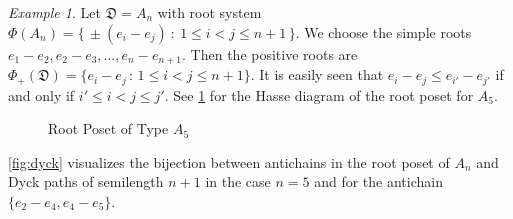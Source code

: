 \documentclass[11pt]{amsart}
\def\fD{\mathfrak{D}}
\theoremstyle{plain}
\numberwithin{lemma}{\DefaultNumberTheoremWithin}
\numberwithin{theorem}{\DefaultNumberTheoremWithin}
\numberwithin{corollary}{\DefaultNumberTheoremWithin}
\numberwithin{proposition}{\DefaultNumberTheoremWithin}
\numberwithin{conjecture}{\DefaultNumberTheoremWithin}
\theoremstyle{definition}
\numberwithin{definition}{\DefaultNumberTheoremWithin}
\numberwithin{question}{\DefaultNumberTheoremWithin}
\numberwithin{problem}{\DefaultNumberTheoremWithin}
\theoremstyle{remark}
\numberwithin{remark}{\DefaultNumberTheoremWithin}
\newtheorem{example}{Example}
\numberwithin{example}{\DefaultNumberTheoremWithin}
\numberwithin{claim}{\DefaultNumberTheoremWithin}
\begin{document}
\begin{example}
   Let $\fD = A_{n}$ with root system 
   $\Phi(A_{n}) = \big\{\,\pm(e_i-e_j)~:~ 1 \leq i <j \leq n+1\,\big\}$.
   We choose the 
   simple roots $e_1-e_2, e_2-e_3,
   \ldots, e_{n}-e_{n+1}$. Then the positive roots
   are $\Phi_+(\fD) = \{ e_i - e_j \,:\,
   1 \leq i < j \leq n+1\}$.
   It is easily seen that 
   $e_i - e_j \leq e_{i'} - e_{j'}$ if and only if
   $i' \leq i < j \leq j'$. See \ref{fig:a6} for the
   Hasse diagram of the root poset for $A_5$.
   
    \begin{figure}[ht!]
\centering
{}
\caption{Root Poset of Type $A_5$} \label{fig:a6}
\end{figure}

\ref{fig:dyck} visualizes the 
bijection between antichains in the root poset of
$A_n$ and Dyck paths of semilength $n+1$ in the case $n = 5$ and
for the antichain $\{e_2-e_4,e_4-e_5\}$.
   \begin{figure}[ht!]
\centering

\end{figure}
\end{example}
\end{document}
